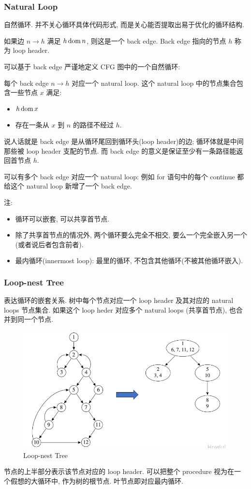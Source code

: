 \subsubsection{Natural Loop}
自然循环. 并不关心循环具体代码形式, 而是关心能否提取出易于优化的循环结构. 

如果边 $n\to h$ 满足 $h \operatorname*{dom} n$, 则这是一个 back edge. Back edge 指向的节点 $h$ 称为 loop header.

可以基于 back edge 严谨地定义 CFG 图中的一个自然循环: 
\begin{definition}
    每个 back edge $n\to h$ 对应一个 natural loop. 这个 natural loop 中的节点集合包含一些节点 $x$ 满足: 
\begin{itemize}
    \item $h \operatorname*{dom} x$
    \item 存在一条从 $x$ 到 $n$ 的路径不经过 $h$. 
\end{itemize}
\end{definition}
说人话就是 back edge 是从循环尾回到循环头(loop header)的边; 循环体就是中间那些被 loop header 支配的节点.  而 back edge 的意义是保证至少有一条路径能返回首节点 $h$. 

可以有多个 back edge 对应一个 natural loop: 例如 for 语句中的每个 continue 都给这个 natural loop 新增了一个 back edge.

注:
\begin{itemize}
    \item 循环可以嵌套, 可以共享首节点.
    \item 除了共享首节点的情况外, 两个循环要么完全不相交, 要么一个完全嵌入另一个(或者说后者包含前者). 
    \item 最内循环(innermost loop): 最里的循环, 不包含其他循环(不被其他循环嵌入). 
\end{itemize}


\subsubsection{Loop-nest Tree}
表达循环的嵌套关系. 树中每个节点对应一个 loop header 及其对应的 natural loops 节点集合. 如果这个 loop heder 对应多个 natural loops (共享首节点), 也合并到同一个节点. 

\begin{figure}[H]
    \centering
    \includegraphics[width=0.84\linewidth]{pic/CP18/Loop-nest Tree}
    \caption{Loop-nest Tree}
\end{figure}
节点的上半部分表示该节点对应的 loop header. 可以把整个 procedure 视为在一个假想的大循环中, 作为树的根节点. 叶节点即对应最内循环. 

